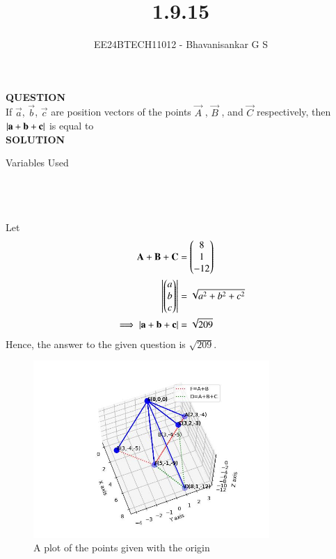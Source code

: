 \documentclass[journal]{IEEEtran}
\begin{document}

\vspace{3cm}

\title{1.9.15}
\author{EE24BTECH11012 - Bhavanisankar G S}
{\let\newpage\relax\maketitle}

\renewcommand{\thefigure}{\theenumi}
\renewcommand{\thetable}{\theenumi}
\setlength{\intextsep}{10pt} %


\renewcommand{\thetable}{\theenumi}

\textbf{QUESTION} \\
If $\vec{a}$, $\vec{b}$, $\vec{c}$ are position vectors of the points $\vec{A}$ , $\vec{B}$ , and $\vec{C}$  respectively, then $\left\vert\mathbf{a}+\mathbf{b}+\mathbf{c}\right\vert$ is equal to \\
\textbf{SOLUTION} \\
\begin{table}[h!]
	\centering
        
	\caption{Variables Used}
	\label{tab10.5.3.9.1}
\end{table} \\ \\ \\
Let 
\begin{align}
	\mathbf{A}+\mathbf{B}+\mathbf{C} &= \begin{pmatrix}8\\1\\-12\end{pmatrix}  \\
	\left\vert\begin{pmatrix}a\\b\\c\end{pmatrix}\right\vert &= \sqrt{a^2 + b^2 + c^2} \\
	\implies	\left\vert\mathbf{a}+\mathbf{b}+\mathbf{c}\right\vert &= \sqrt{209}  \\
\end{align}
Hence, the answer to the given question is $\sqrt{209}$.

\begin{figure}[h]
	\centering
	\includegraphics[width=0.8\textwidth]{figs/figure.jpg}
	\caption{A plot of the points given with the origin}
\end{figure}
\end{document}
